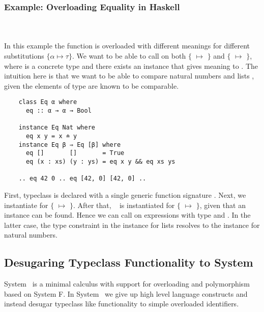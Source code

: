 \subsubsection{Example: Overloading Equality in Haskell}\hfill\\\\
In this example the function  is overloaded with different meanings for different substitutions $\{α \mapsto τ\}$. 
We want to be able to call  on both $\{$ $\mapsto$ $\}$ and $\{$ $\mapsto$ \inl{[β]}$\}$, where  is a concrete type and there exists an instance that gives meaning to . The intuition here is that we want to be able to compare natural numbers  and lists \mono{[β]}, given the elements of type  are known to be comparable.
\begin{verbatim}
    class Eq α where
      eq :: α → α → Bool 

    instance Eq Nat where
      eq x y = x ≐ y
    instance Eq β ⇒ Eq [β] where
      eq []       []       = True
      eq (x : xs) (y : ys) = eq x y && eq xs ys 

    .. eq 42 0 .. eq [42, 0] [42, 0] ..
\end{verbatim}
First, typeclass  is declared with a single generic function signature . Next, we instantiate  for $\{$ $\mapsto$ $\}$. 
After that, \  is instantiated for $\{$ $\mapsto$ \inl{[β]}$\}$, given that an instance  can be found.
Hence we can call  on expressions with type  and \inl{[Nat]}. In the latter case, the type constraint  in the instance for lists resolves to the instance for natural numbers.

\subsection{Desugaring Typeclass Functionality to System \Fo}
System \Fo\ is a minimal calculus with support for overloading and polymorphism based on System F.  
In System \Fo\ we give up high level language constructs and instead desugar typeclass like functionality to simple overloaded identifiers. 

